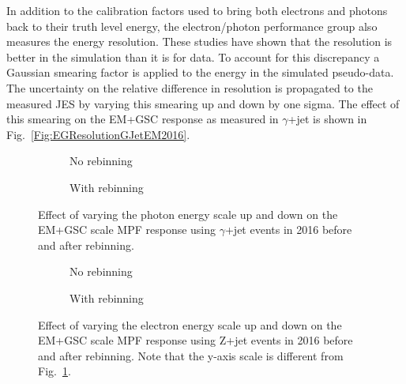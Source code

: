 In addition to the calibration factors used to bring both electrons and photons back to their truth level energy, the electron/photon performance group also measures the energy resolution.  
These studies have shown that the resolution is better in the simulation than it is for data.  
To account for this discrepancy a Gaussian smearing factor is applied to the energy in the simulated pseudo-data.  
The uncertainty on the relative difference in resolution is propagated to the measured JES by varying this smearing up and down by one sigma.  
The effect of this smearing on the EM+GSC response as measured in $\gamma$+jet is shown in Fig.~\ref{Fig:EGResolutionGJetEM2016}.  

\begin{figure}[!ht]
\centering
\begin{subfigure}{.5\textwidth}
\centering
{}
\caption{No rebinning}
\end{subfigure}%
\begin{subfigure}{.5\textwidth}  \centering
{}
\caption{With rebinning}
\end{subfigure}
\caption{Effect of varying the photon energy scale up and down on the EM+GSC scale MPF response using $\gamma$+jet events in 2016 before and after rebinning. }
\label{Fig:EGScaleGJetEM2016}
\end{figure}

\begin{figure}[!ht]
\centering
\begin{subfigure}{.5\textwidth}
\centering
{}
\caption{No rebinning}
\end{subfigure}%
\begin{subfigure}{.5\textwidth}  \centering
{}
\caption{With rebinning}
\end{subfigure}
\caption{Effect of varying the electron energy scale up and down on the EM+GSC scale MPF response using Z+jet events in 2016 before and after rebinning.  Note that the y-axis scale is different from Fig.~\ref{Fig:EGScaleGJetEM2016}. } 
\label{Fig:EGScaleZJetEM2016}
\end{figure}


